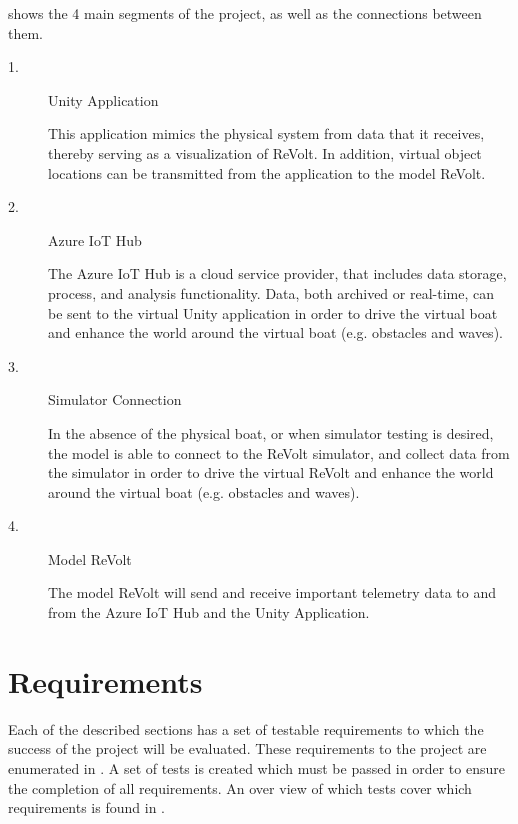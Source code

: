  shows the 4 main segments of the project, as well as the connections between them. 
\begin{description}
 \item[1.] Unity Application
 
 This application mimics the physical system from data that it receives, thereby serving as a visualization of ReVolt. In addition, virtual object locations can be transmitted from the application to the model ReVolt.
 \item[2.] Azure IoT Hub
 
 The Azure IoT Hub is a cloud service provider, that includes data storage, process, and analysis functionality. Data, both archived or real-time, can be sent to the virtual Unity application in order to drive the virtual boat and enhance the world around the virtual boat (e.g. obstacles and waves).
 \item[3.] Simulator Connection
 
 In the absence of the physical boat, or when simulator testing is desired, the model is able to connect to the ReVolt simulator, and collect data from the simulator in order to drive the virtual ReVolt and enhance the world around the virtual boat (e.g. obstacles and waves).
 \item[4.] Model ReVolt
 
 The model ReVolt will send and receive important telemetry data to and from the Azure IoT Hub and the Unity Application.
\end{description}







\section{Requirements}
Each of the described sections has a set of testable requirements to which the success of the project will be evaluated. These requirements to the project are enumerated in . A set of tests is created which must be passed in order to ensure the completion of all requirements. An over view of which tests cover which requirements is found in .

